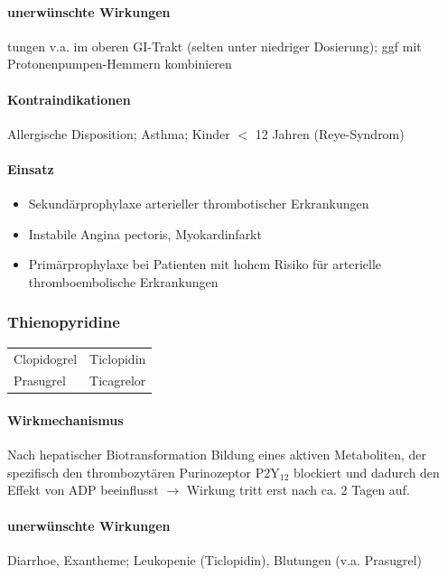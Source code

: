 \documentclass[10pt,a4paper]{report}
\begin{document}
\paragraph{unerwünschte Wirkungen} %
\label{par:paragraph_name}
tungen v.a. im oberen GI-Trakt (selten unter niedriger Dosierung); ggf mit Protonenpumpen-Hemmern kombinieren
\paragraph{Kontraindikationen} %
\label{par:kontraindikationen}
Allergische Disposition; Asthma; Kinder $<$ 12 Jahren (Reye-Syndrom)
\paragraph{Einsatz} %
\label{par:einsatz}
\begin{itemize}
	\item  Sekundärprophylaxe arterieller thrombotischer Erkrankungen
	\item Instabile Angina pectoris, Myokardinfarkt
	\item Primärprophylaxe bei Patienten mit hohem Risiko für arterielle thromboembolische Erkrankungen
\end{itemize}
\subsubsection{Thienopyridine} %
\label{ssub:thienopyridine}
\begin{tabularx}{\textwidth}{XX}
Clopidogrel&Ticlopidin\\
Prasugrel&Ticagrelor\\
\end{tabularx}
\paragraph{Wirkmechanismus} %
\label{par:wirkmechan}
Nach hepatischer Biotransformation Bildung eines aktiven Metaboliten, der spezifisch den thrombozytären Purinozeptor P2Y$_12$ blockiert und dadurch den Effekt von ADP beeinflusst $\rightarrow$ Wirkung tritt erst nach ca. 2 Tagen auf.
\paragraph{unerwünschte Wirkungen} %
\label{par:unerw_nschte_wirkungen}
Diarrhoe, Exantheme;  Leukopenie (Ticlopidin), Blutungen (v.a. Prasugrel)
\end{document}
